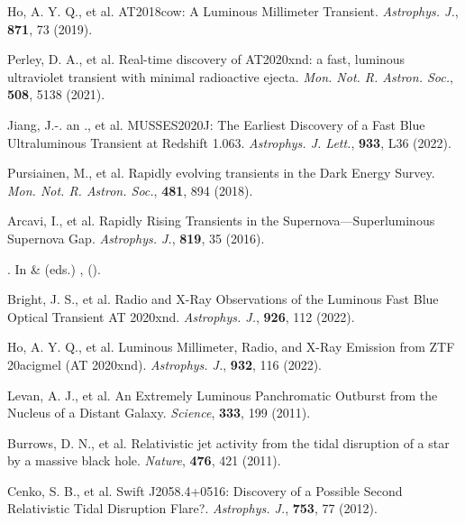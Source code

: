 \documentclass{nature_plusfigure}
\newcommand{\mn}{{Mon. Not. R. Astron. Soc.}}
\newcommand{\mnras}{\mn}
\newcommand{\apj}{{Astrophys. J.}}
\newcommand{\apjl}{{Astrophys. J. Lett.}}
\newcommand{\nat}{{Nature}}
\begin{document}
\begin{methods}
\begin{thebibliography}{10}

 Ho, A. Y. Q., et al. AT2018cow: A Luminous Millimeter Transient. \emph{\apj}, \textbf{871}, 73 (2019). 

 Perley, D. A., et al. Real-time discovery of AT2020xnd: a fast, luminous ultraviolet transient with minimal radioactive ejecta. \emph{\mnras}, \textbf{508}, 5138 (2021). 

 Jiang, J.-. an ., et al. MUSSES2020J: The Earliest Discovery of a Fast Blue Ultraluminous Transient at Redshift 1.063. \emph{\apjl}, \textbf{933}, L36 (2022). 

 Pursiainen, M., et al. Rapidly evolving transients in the Dark Energy Survey. \emph{\mnras}, \textbf{481}, 894 (2018). 

 Arcavi, I., et al. Rapidly Rising Transients in the Supernova—Superluminous Supernova Gap. \emph{\apj}, \textbf{819}, 35 (2016). 

\newblock {}.
\newblock In  \&  (eds.) \emph{},
   ().

 Bright, J. S., et al. Radio and X-Ray Observations of the Luminous Fast Blue Optical Transient AT 2020xnd. \emph{\apj}, \textbf{926}, 112 (2022). 

 Ho, A. Y. Q., et al. Luminous Millimeter, Radio, and X-Ray Emission from ZTF 20acigmel (AT 2020xnd). \emph{\apj}, \textbf{932}, 116 (2022). 



  Levan, A. J., et al. An Extremely Luminous Panchromatic Outburst from the Nucleus of a Distant Galaxy. \emph{Science}, \textbf{333}, 199 (2011). 

  Burrows, D. N., et al. Relativistic jet activity from the tidal disruption of a star by a massive black hole. \emph{\nat}, \textbf{476}, 421 (2011). 

 Cenko, S. B., et al. Swift J2058.4+0516: Discovery of a Possible Second Relativistic Tidal Disruption Flare?. \emph{\apj}, \textbf{753}, 77 (2012). 


\end{thebibliography}
\end{methods}
\end{document}
